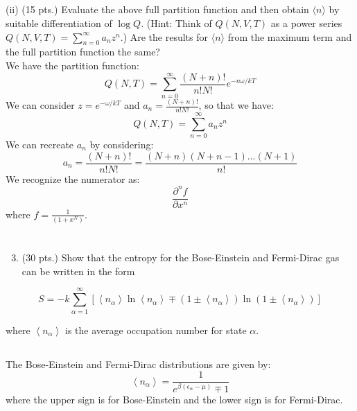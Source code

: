 \documentclass[10pt]{article}
\begin{document}
\subsection{}
(ii) (15 pts.) Evaluate the above full partition function and then obtain $\langle n\rangle$ by suitable differentiation of $\log Q$. (Hint: Think of $Q(N, V, T)$ as a power series $Q(N, V, T)=\sum_{n=0}^{\infty} a_{n} z^{n}$.) Are the results for $\langle n\rangle$ from the maximum term and the full partition function the same?\\
We have the partition function:
\begin{equation}
  Q(N,T)=\sum_{n=0}^{\infty}\frac{(N+n)!}{n!N!}e^{-n\omega/kT}
\end{equation}
We can consider $z=e^{-\omega/kT}$ and $a_{n}=\frac{(N+n)!}{n!N!}$, so that we have:
\begin{equation}
  Q(N,T)=\sum_{n=0}^{\infty} a_{n} z^{n}
\end{equation}
We can recreate $a_{n}$ by considering:
\begin{equation}
  a_{n}=\frac{(N+n)!}{n!N!}=\frac{(N+n)(N+n-1)...(N+1)}{n!}
\end{equation}
We recognize the numerator as:
\begin{equation}
  \frac{\partial^n f}{\partial x^n}
\end{equation}
where $f=\frac{1}{(1+x^N)}$.
\section{}
\begin{enumerate}
  \setcounter{enumi}{2}
  \item (30 pts.) Show that the entropy for the Bose-Einstein and Fermi-Dirac gas can be written in the form
\end{enumerate}

$$
S=-k \sum_{\alpha=1}^{\infty}\left[\left\langle n_{\alpha}\right\rangle \ln \left\langle n_{\alpha}\right\rangle \mp\left(1 \pm\left\langle n_{\alpha}\right\rangle\right) \ln \left(1 \pm\left\langle n_{\alpha}\right\rangle\right)\right]
$$

where $\left\langle n_{\alpha}\right\rangle$ is the average occupation number for state $\alpha$.
\subsection{}
The Bose-Einstein and Fermi-Dirac distributions are given by:
\begin{equation}
  \left\langle n_{\alpha}\right\rangle=\frac{1}{e^{\beta\left(\epsilon_{\alpha}-\mu\right)}\mp 1}
\end{equation}
where the upper sign is for Bose-Einstein and the lower sign is for Fermi-Dirac.
\end{document}
